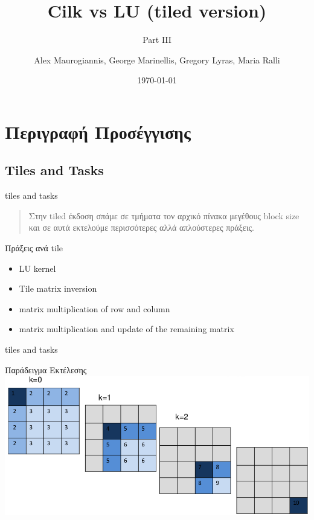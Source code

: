 \documentclass{beamer}
\author[afein,fedjo,mastergreg,mariaral]{Alex Maurogiannis, George Marinellis, Gregory Lyras, Maria Ralli}
\institute{CSlab @ NTUA}
\title{Cilk vs LU (tiled version)}
\subtitle{Part III}
\date{\today}
\begin{document}
\begin{frame}
    \titlepage
\end{frame}

\section{Περιγραφή Προσέγγισης}
\subsection{Tiles and Tasks}
\begin{frame}{tiles and tasks}
    \begin{quote}
        Στην tiled έκδοση σπάμε σε τμήματα τον αρχικό πίνακα μεγέθους block size
        και σε αυτά εκτελούμε περισσότερες αλλά απλούστερες πράξεις.
    \end{quote}
    \pause

    \begin{block}{Πράξεις ανά tile}
        \begin{itemize}
            \item<2-> LU kernel
            \item<3-> Tile matrix inversion
            \item<4-> matrix multiplication of row and column
            \item<5-> matrix multiplication and update of the remaining matrix
        \end{itemize}
    \end{block}

\end{frame}

\begin{frame}{tiles and tasks}
    \begin{block}{Παράδειγμα Εκτέλεσης}
        \includegraphics[width=\textwidth]{files/pps-ex2-pres_tables.png}
    \end{block}
\end{frame}
\end{document}
